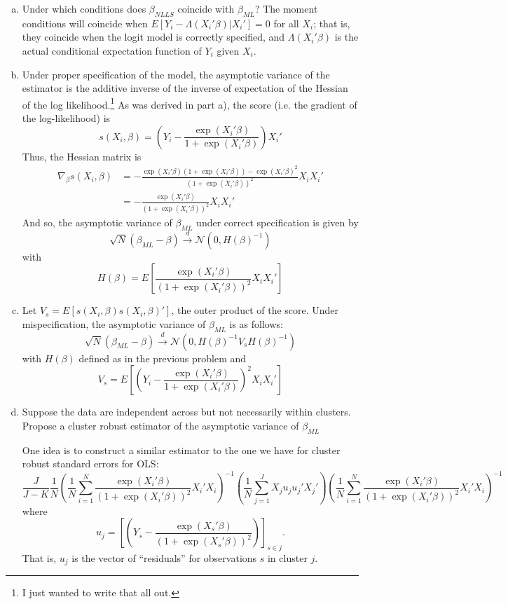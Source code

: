 \documentclass[11pt]{article}
\begin{document}
\begin{enumerate}[a)]
	\item Under which conditions does $\beta_{NLLS}$ coincide with $\beta_{ML}$? The moment conditions will coincide when $E[Y_i - \Lambda(X_i'\beta) | X_i'] = 0$ for all $X_i$; that is, they coincide when the logit model is correctly specified, and $\Lambda(X_i'\beta)$ is the actual conditional expectation function of $Y_i$ given $X_i$.

	\item
	Under proper specification of the model, the asymptotic variance of the estimator is the additive inverse of the inverse of expectation of the Hessian of the log likelihood.\footnote{I just wanted to write that all out.} As was derived in part a), the score (i.e. the gradient of the log-likelihood) is
	$$s(X_i,\beta) = \left(Y_i - \frac{\exp(X_i' \beta)}{1 + \exp(X_i'\beta)}\right)X_i'$$
	Thus, the Hessian matrix is 
	\begin{align*}
	\nabla_\beta s(X_i,\beta) & = -\frac{\exp(X_i'\beta)(1+\exp(X_i'\beta)) - \exp(X_i'\beta)^2}{(1+\exp(X_i'\beta))^2}X_i X_i' \\
	& = -\frac{\exp(X_i'\beta)}{(1+ \exp(X_i'\beta))^2}X_iX_i'
	\end{align*}
	And so, the asymptotic variance of $\beta_{ML}$ under correct specification is given by
	$$\sqrt{N}(\beta_{ML} - \beta) \overset{d}{\to} \mathcal{N}(0,H(\beta)^{-1})$$
	with
	$$H(\beta) = E\left[\frac{\exp(X_i'\beta)}{(1+ \exp(X_i'\beta))^2}X_iX_i'\right]$$

	\item Let $V_s = E\left[s(X_i,\beta)s(X_i,\beta)'\right]$, the outer product of the score. Under mispecification, the asymptotic variance of $\beta_{ML}$ is as follows:
	$$\sqrt{N}(\beta_{ML} - \beta) \overset{d}{\to} \mathcal{N}\left(0,H(\beta)^{-1}V_{s}H(\beta)^{-1}\right)$$
	with $H(\beta)$ defined as in the previous problem and 
	$$V_s = E\left[\left(Y_i - \frac{\exp(X_i'\beta)}{1+\exp(X_i'\beta)}\right)^2X_i X_i'\right]$$

	\item Suppose the data are independent across but not necessarily within clusters. Propose a cluster robust estimator of the asymptotic variance of $\beta_{ML}$

	One idea is to construct a similar estimator to the one we have for cluster robust standard errors for OLS:
	$$\frac{J}{J-K}\frac{1}{N}\left(\frac{1}{N}\sum_{i=1}^N \frac{\exp(X_i'\beta)}{(1+\exp(X_i'\beta))^2}X_i' X_i \right)^{-1} 
	\left(\frac{1}{N} \sum_{j=1}^{J}X_j u_j u_j' X_j'\right)\left(\frac{1}{N}\sum_{i=1}^N \frac{\exp(X_i'\beta)}{(1+\exp(X_i'\beta))^2}X_i' X_i \right)^{-1} $$
	where $$u_j = \left[\left(Y_s - \frac{\exp(X_s'\beta)}{(1+\exp(X_s'\beta))^2}\right)\right]_{s \in j}.$$
	That is, $u_j$ is the vector of ``residuals'' for observations $s$ in cluster $j$.
\end{enumerate}
\end{document}
